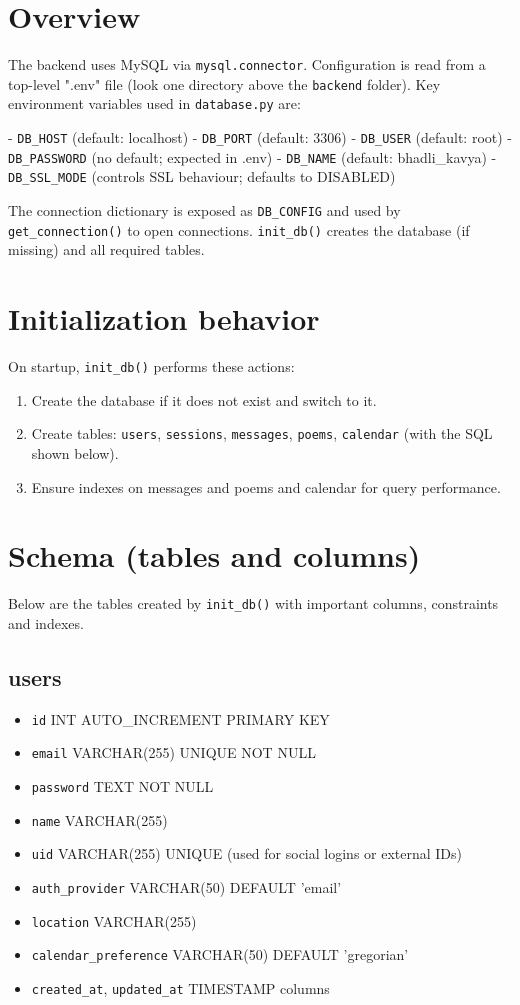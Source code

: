 \section*{Overview}
The backend uses MySQL via \texttt{mysql.connector}. Configuration is read from a top-level ".env" file (look one directory above the \texttt{backend} folder). Key environment variables used in \texttt{database.py} are:

- \texttt{DB\_HOST} (default: localhost)
- \texttt{DB\_PORT} (default: 3306)
- \texttt{DB\_USER} (default: root)
- \texttt{DB\_PASSWORD} (no default; expected in .env)
- \texttt{DB\_NAME} (default: bhadli\_kavya)
- \texttt{DB\_SSL\_MODE} (controls SSL behaviour; defaults to DISABLED)

The connection dictionary is exposed as \texttt{DB\_CONFIG} and used by \texttt{get\_connection()} to open connections. \texttt{init\_db()} creates the database (if missing) and all required tables.

\section*{Initialization behavior}
On startup, \texttt{init\_db()} performs these actions:
\begin{enumerate}
  \item Create the database if it does not exist and switch to it.
  \item Create tables: \texttt{users}, \texttt{sessions}, \texttt{messages}, \texttt{poems}, \texttt{calendar} (with the SQL shown below).
  \item Ensure indexes on messages and poems and calendar for query performance.
\end{enumerate}

\section*{Schema (tables and columns)}
Below are the tables created by \texttt{init\_db()} with important columns, constraints and indexes.

\subsection*{users}
\begin{itemize}
  \item \texttt{id} INT AUTO\_INCREMENT PRIMARY KEY
  \item \texttt{email} VARCHAR(255) UNIQUE NOT NULL
  \item \texttt{password} TEXT NOT NULL
  \item \texttt{name} VARCHAR(255)
  \item \texttt{uid} VARCHAR(255) UNIQUE (used for social logins or external IDs)
  \item \texttt{auth\_provider} VARCHAR(50) DEFAULT 'email'
  \item \texttt{location} VARCHAR(255)
  \item \texttt{calendar\_preference} VARCHAR(50) DEFAULT 'gregorian'
  \item \texttt{created\_at}, \texttt{updated\_at} TIMESTAMP columns
\end{itemize}

